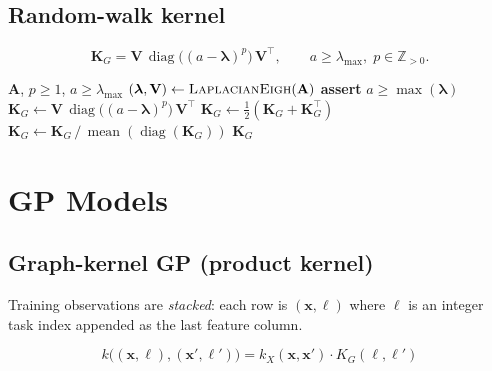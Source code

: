 \documentclass[11pt]{article}
\begin{document}
\subsection{Random-walk kernel}

\[
\mathbf{K}_G = \mathbf{V}\,\operatorname{diag}\!\bigl((a - \bm{\lambda})^p\bigr)\,\mathbf{V}^\top,
\qquad a \geq \lambda_{\max},\; p \in \mathbb{Z}_{>0}.
\]

\begin{algorithm}[H]
\caption{Random-walk kernel (fixed)}
\begin{algorithmic}[1]
\Require $\mathbf{A}$, $p \geq 1$, $a \geq \lambda_{\max}$
\State $(\bm{\lambda}, \mathbf{V}) \gets \textsc{LaplacianEigh}(\mathbf{A})$
\State \textbf{assert} $a \geq \max(\bm{\lambda})$ 
\State $\mathbf{K}_G \gets \mathbf{V}\,\operatorname{diag}\!\bigl((a-\bm{\lambda})^p\bigr)\,\mathbf{V}^\top$
\State $\mathbf{K}_G \gets \tfrac{1}{2}(\mathbf{K}_G + \mathbf{K}_G^\top)$
\State $\mathbf{K}_G \gets \mathbf{K}_G \,/\, \operatorname{mean}(\operatorname{diag}(\mathbf{K}_G))$
\State \Return $\mathbf{K}_G$
\end{algorithmic}
\end{algorithm}

\section{GP Models}

\subsection{Graph-kernel GP (product kernel)}

Training observations are \emph{stacked}: each row is $(\mathbf{x}, \ell)$ where $\ell$
is an integer task index appended as the last feature column.

\[
k\!\bigl((\mathbf{x},\ell),(\mathbf{x}',\ell')\bigr)
= k_X(\mathbf{x},\mathbf{x}') \cdot K_G(\ell,\ell')
\]
\end{document}
